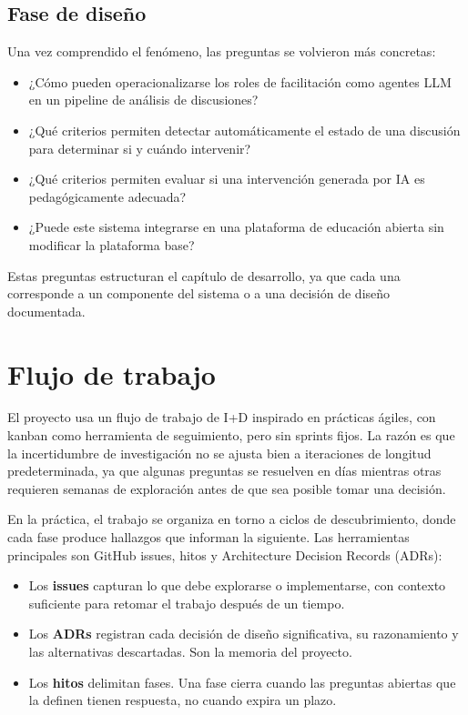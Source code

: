 \subsection{Fase de diseño}

Una vez comprendido el fenómeno, las preguntas se volvieron más concretas:

\begin{itemize}
  \item ¿Cómo pueden operacionalizarse los roles de facilitación como agentes LLM en un pipeline de análisis de discusiones?
  \item ¿Qué criterios permiten detectar automáticamente el estado de una discusión para determinar si y cuándo intervenir?
  \item ¿Qué criterios permiten evaluar si una intervención generada por IA es pedagógicamente adecuada?
  \item ¿Puede este sistema integrarse en una plataforma de educación abierta sin modificar la plataforma base?
\end{itemize}

Estas preguntas estructuran el capítulo de desarrollo, ya que cada una corresponde a un componente del sistema o a una decisión de diseño documentada.

\section{Flujo de trabajo}

El proyecto usa un flujo de trabajo de I+D inspirado en prácticas ágiles, con kanban como herramienta de seguimiento, pero sin sprints fijos. La razón es que la incertidumbre de investigación no se ajusta bien a iteraciones de longitud predeterminada, ya que algunas preguntas se resuelven en días mientras otras requieren semanas de exploración antes de que sea posible tomar una decisión.

En la práctica, el trabajo se organiza en torno a ciclos de descubrimiento, donde cada fase produce hallazgos que informan la siguiente. Las herramientas principales son GitHub issues, hitos y Architecture Decision Records (ADRs):

\begin{itemize}
  \item Los \textbf{issues} capturan lo que debe explorarse o implementarse, con contexto suficiente para retomar el trabajo después de un tiempo.
  \item Los \textbf{ADRs} registran cada decisión de diseño significativa, su razonamiento y las alternativas descartadas. Son la memoria del proyecto.
  \item Los \textbf{hitos} delimitan fases. Una fase cierra cuando las preguntas abiertas que la definen tienen respuesta, no cuando expira un plazo.
\end{itemize}

